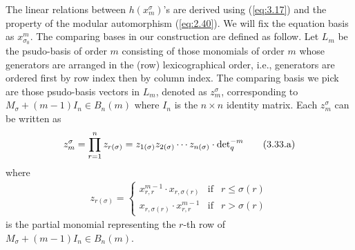 \documentclass[table,a4paper,reqno]{amsart}
\numberwithin{equation}{section}
\theoremstyle{definition}
\begin{document}

The linear relations between $h(x_{m}^\sigma)$'s are derived using (\ref{eq:3.17}) and the property of the modular automorphism (\ref{eq:2.40}). We will fix the equation basis as $x_{\sigma_0}^{m}$. The comparing bases in our construction are defined as follow. Let $L_m$ be the psudo-basis of order $m$ consisting of those monomials of order $m$ whose generators are arranged in the (row) lexicographical order, i.e., generators are ordered first by row index then by column index. The comparing basis we pick are those psudo-basis vectors in $L_m$, denoted as $z_m^\sigma$, corresponding to $M_\sigma+(m-1)I_n\in B_n(m)$ where $I_n$ is the $n\times n$ identity matrix. Each $z_m^\sigma$ can be written as
\begin{align}\stepcounter{equation}
    z_{m}^\sigma=\prod_{r=1}^nz_{r(\sigma)}=z_{1(\sigma)}z_{2(\sigma)}\cdots z_{n(\sigma)}\cdot \text{det}_q^{-m}\tag{3.33.a}\label{eq:3.33.a}
\end{align}
where
\begin{align}\tag{3.33.b}\label{eq:3.33.b}
    z_{r(\sigma)}=\left\{ \begin{array}{rcl}
x_{r,r}^{m-1}\cdot x_{r,\sigma(r)} & \mbox{if}
& r\le \sigma(r) \\ x_{r,\sigma(r)}\cdot x_{r,r}^{m-1} & \mbox{if} & r> \sigma(r)
\end{array}\right.
\end{align}
is the partial monomial representing the $r$-th row of $M_\sigma+(m-1)I_n\in B_n(m)$. 
\end{document}

